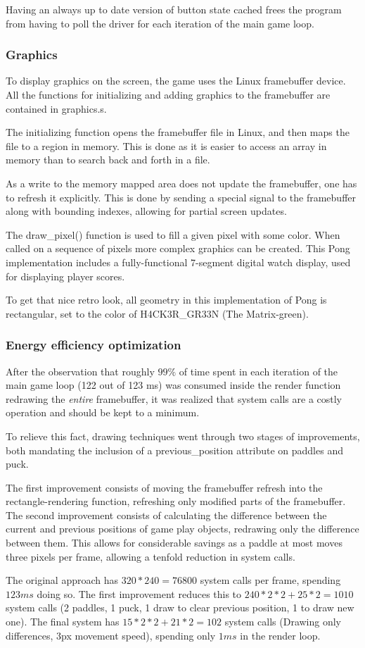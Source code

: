 Having an always up to date version of button state cached frees the program
from having to poll the driver for each iteration of the main game loop.

\subsubsection{Graphics}
To display graphics on the screen, the game uses the Linux framebuffer device.
All the functions for initializing and adding graphics to the framebuffer are
contained in graphics.s.

The initializing function opens the framebuffer file in Linux, and then maps
the file to a region in memory. This is done as it is easier to access an array
in memory than to search back and forth in a file.

As a write to the memory mapped area does not update the framebuffer,
one has to refresh it explicitly.
This is done by sending a special signal to the framebuffer
along with bounding indexes, allowing for partial screen updates.

The draw\_pixel() function is used to fill a given pixel with some color.  When
called on a sequence of pixels more complex graphics can be created.  This Pong
implementation includes a fully-functional 7-segment digital watch display,
used for displaying player scores.

To get that nice retro look, all geometry in this implementation of Pong is
rectangular, set to the color of H4CK3R\_GR33N (The Matrix-green).

\subsubsection{Energy efficiency optimization}
After the observation that
roughly $ 99 \% $ of time spent in each iteration of the main game loop (122
out of 123 ms) was consumed inside the render function redrawing the
\emph{entire} framebuffer, it was realized that system calls are a costly
operation and should be kept to a minimum.

To relieve this fact, drawing techniques went through two stages of
improvements, both mandating the inclusion of a previous\_position attribute on
paddles and puck.

The first improvement consists of moving the framebuffer refresh into the
rectangle-rendering function, refreshing only modified parts of the
framebuffer.  The second improvement consists of calculating the difference
between the current and previous positions of game play objects, redrawing only
the difference between them.  This allows for considerable savings as a paddle
at most moves three pixels per frame, allowing a tenfold reduction in system
calls.

The original approach has $ 320 * 240 = 76800 $ system calls per frame,
spending $ 123 ms $ doing so.  The first improvement reduces this to 
$ 240 * 2 * 2+ 25 * 2 = 1010 $ system calls (2 paddles, 1 puck, 1 draw to clear
previous position, 1 to draw new one).  The final system has 
$ 15 * 2 * 2 + 21 * 2 = 102$ system calls (Drawing only differences, 3px 
movement speed), spending only $1 ms $ in the render loop.
